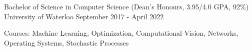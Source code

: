 
\begin{cventries}
  \cventry
    {Bachelor of Science in Computer Science (Dean's Honours, 3.95/4.0 GPA, 92\%)} %
    {University of Waterloo} %
    {} %
    {September 2017 - April 2022} %
    {
      \begin{cvitems} %
        \item {Courses: Machine Learning, Optimization, Computational Vision, Networks, Operating Systems, Stochastic Processes}
      \end{cvitems}
    }
\end{cventries}
